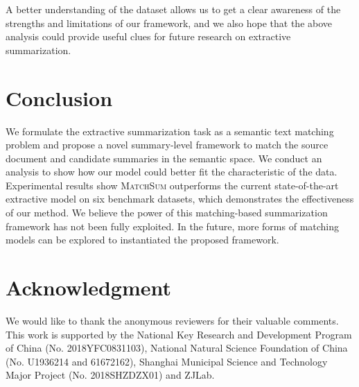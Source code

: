 A better understanding of the dataset allows us to get a clear awareness of the strengths and limitations of our framework, and we also hope that the above analysis could provide useful clues for future research on extractive summarization.

\section{Conclusion}
We formulate the extractive summarization task as a semantic text matching problem and propose a novel summary-level framework to match the source document and candidate summaries in the semantic space.
We conduct an analysis to show how our model could better fit the characteristic of the data. Experimental results show \textsc{MatchSum} outperforms the current state-of-the-art extractive model on six benchmark datasets, which demonstrates the effectiveness of our method. We believe the power of this matching-based summarization framework has not been fully exploited. In the future, more forms of matching models can be explored to instantiated the proposed framework.

\section*{Acknowledgment}
We would like to thank the anonymous reviewers for their valuable comments. This work is supported by the National Key Research and Development Program of China (No. 2018YFC0831103), National Natural Science Foundation of China (No. U1936214 and 61672162), Shanghai Municipal Science and Technology Major Project (No. 2018SHZDZX01) and ZJLab.

